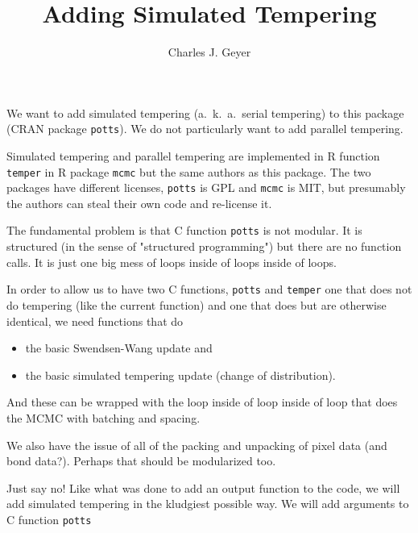 \documentclass[11pt]{article}
\let\code=\texttt
\begin{document}
\title{Adding Simulated Tempering}

\author{Charles J. Geyer}

\maketitle

We want to add simulated tempering (a.~k.~a.\ serial tempering) to
this package (CRAN package \code{potts}).
We do not particularly want to add parallel tempering.

Simulated tempering and parallel tempering are implemented in R function
\code{temper} in R package \code{mcmc} but the same authors as this package.
The two packages have different licenses, \code{potts} is GPL and \code{mcmc}
is MIT, but presumably the authors can steal their own code and re-license it.

The fundamental problem is that C function \code{potts} is not modular.
It is structured (in the sense of "structured programming") but there
are no function calls.  It is just one big mess of loops inside of loops
inside of loops.

In order to allow us to have two C functions, \code{potts} and \code{temper}
one that does not do tempering (like the current function) and one that does
but are otherwise identical, we need functions that do
\begin{itemize}
\item the basic Swendsen-Wang update and
\item the basic simulated tempering update (change of distribution).
\end{itemize}
And these can be wrapped with the loop inside of loop inside of loop that
does the MCMC with batching and spacing.

We also have the issue of all of the packing and unpacking of pixel data
(and bond data?).  Perhaps that should be modularized too.

Just say no!  Like what was done to add an output function to the code,
we will add simulated tempering in the kludgiest possible way.  We will
add arguments to C function \code{potts}
\end{document}
